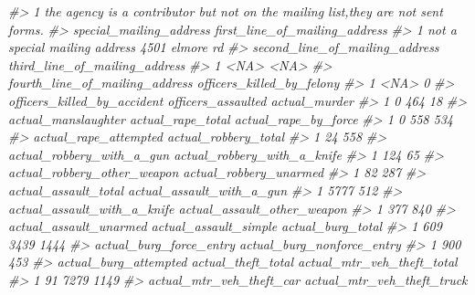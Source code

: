 \documentclass[
]{krantz}
\makeatletter
\newenvironment{Shaded}{\begin{snugshade}}{\end{snugshade}}
\newcommand{\CommentTok}[1]{\textcolor[rgb]{0.37,0.37,0.37}{\textit{#1}}}
\newenvironment{kframe}{%
\medskip{}
\setlength{\fboxsep}{.8em}
 \def\at@end@of@kframe{}%
 \ifinner\ifhmode%
  \def\at@end@of@kframe{\end{minipage}}%
  \begin{minipage}{\columnwidth}%
 \fi\fi%
 \def\FrameCommand##1{\hskip\@totalleftmargin \hskip-\fboxsep
 \colorbox{shadecolor}{##1}\hskip-\fboxsep
     \hskip-\linewidth \hskip-\@totalleftmargin \hskip\columnwidth}%
 \MakeFramed {\advance\hsize-\width
   \@totalleftmargin\z@ \linewidth\hsize
   \@setminipage}}%
 {\par\unskip\endMakeFramed%
 \at@end@of@kframe}
\renewenvironment{Shaded}{\begin{kframe}}{\end{kframe}}
\makeatother
\begin{document}
\begin{Shaded}
\begin{Highlighting}[]
\CommentTok{\#\textgreater{} 1 the agency is a contributor but not on the mailing list,they are not sent forms.}
\CommentTok{\#\textgreater{}         special\_mailing\_address first\_line\_of\_mailing\_address}
\CommentTok{\#\textgreater{} 1 not a special mailing address                4501 elmore rd}
\CommentTok{\#\textgreater{}   second\_line\_of\_mailing\_address third\_line\_of\_mailing\_address}
\CommentTok{\#\textgreater{} 1                           \textless{}NA\textgreater{}                          \textless{}NA\textgreater{}}
\CommentTok{\#\textgreater{}   fourth\_line\_of\_mailing\_address officers\_killed\_by\_felony}
\CommentTok{\#\textgreater{} 1                           \textless{}NA\textgreater{}                         0}
\CommentTok{\#\textgreater{}   officers\_killed\_by\_accident officers\_assaulted actual\_murder}
\CommentTok{\#\textgreater{} 1                           0                464            18}
\CommentTok{\#\textgreater{}   actual\_manslaughter actual\_rape\_total actual\_rape\_by\_force}
\CommentTok{\#\textgreater{} 1                   0               558                  534}
\CommentTok{\#\textgreater{}   actual\_rape\_attempted actual\_robbery\_total}
\CommentTok{\#\textgreater{} 1                    24                  558}
\CommentTok{\#\textgreater{}   actual\_robbery\_with\_a\_gun actual\_robbery\_with\_a\_knife}
\CommentTok{\#\textgreater{} 1                       124                          65}
\CommentTok{\#\textgreater{}   actual\_robbery\_other\_weapon actual\_robbery\_unarmed}
\CommentTok{\#\textgreater{} 1                          82                    287}
\CommentTok{\#\textgreater{}   actual\_assault\_total actual\_assault\_with\_a\_gun}
\CommentTok{\#\textgreater{} 1                 5777                       512}
\CommentTok{\#\textgreater{}   actual\_assault\_with\_a\_knife actual\_assault\_other\_weapon}
\CommentTok{\#\textgreater{} 1                         377                         840}
\CommentTok{\#\textgreater{}   actual\_assault\_unarmed actual\_assault\_simple actual\_burg\_total}
\CommentTok{\#\textgreater{} 1                    609                  3439              1444}
\CommentTok{\#\textgreater{}   actual\_burg\_force\_entry actual\_burg\_nonforce\_entry}
\CommentTok{\#\textgreater{} 1                     900                        453}
\CommentTok{\#\textgreater{}   actual\_burg\_attempted actual\_theft\_total actual\_mtr\_veh\_theft\_total}
\CommentTok{\#\textgreater{} 1                    91               7279                       1149}
\CommentTok{\#\textgreater{}   actual\_mtr\_veh\_theft\_car actual\_mtr\_veh\_theft\_truck}

\end{Highlighting}
\end{Shaded}
\end{document}
